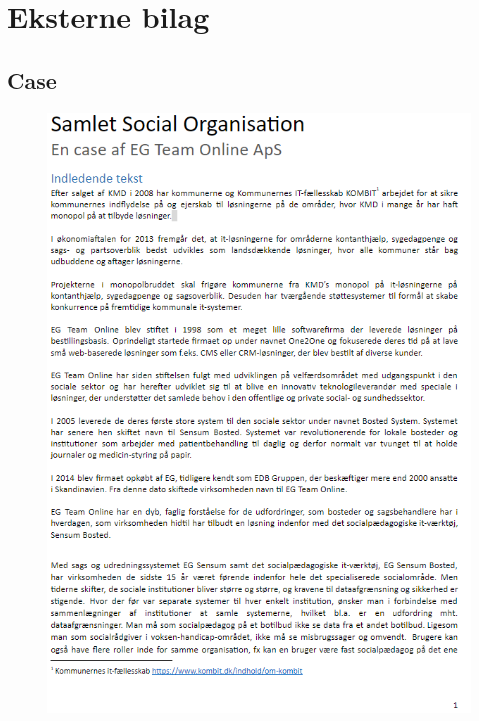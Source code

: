 \chapter{Eksterne bilag}

\section{Case}\label{eks:Case}
\begin{figure}[hbt!]
\begin{center}
  \includegraphics[scale = 0.8]{./PNG/Case/Case_1.png} 
\end{center}
\end{figure}

